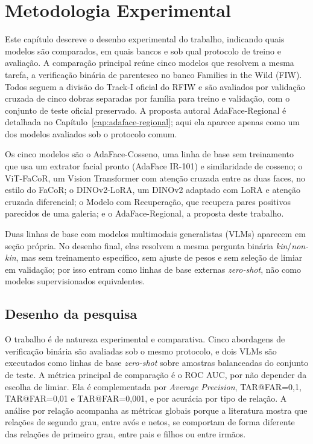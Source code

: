 \chapter[Metodologia Experimental]{Metodologia Experimental}
\label{cap:Metodologia}

Este capítulo descreve o desenho experimental do trabalho, indicando quais modelos são comparados, em quais bancos e sob qual protocolo de treino e avaliação. A comparação principal reúne cinco modelos que resolvem a mesma tarefa, a verificação binária de parentesco no banco Families in the Wild (FIW). Todos seguem a divisão do Track-I oficial do RFIW e são avaliados por validação cruzada de cinco dobras separadas por família para treino e validação, com o conjunto de teste oficial preservado. A proposta autoral AdaFace-Regional é detalhada no Capítulo~\ref{cap:adaface-regional}; aqui ela aparece apenas como um dos modelos avaliados sob o protocolo comum.

Os cinco modelos são o AdaFace-Cosseno, uma linha de base sem treinamento que usa um extrator facial pronto (AdaFace IR-101) e similaridade de cosseno; o ViT-FaCoR, um Vision Transformer com atenção cruzada entre as duas faces, no estilo do FaCoR; o DINOv2-LoRA, um DINOv2 adaptado com LoRA e atenção cruzada diferencial; o Modelo com Recuperação, que recupera pares positivos parecidos de uma galeria; e o AdaFace-Regional, a proposta deste trabalho.

Duas linhas de base com modelos multimodais generalistas (VLMs) aparecem em seção própria. No desenho final, elas resolvem a mesma pergunta binária \textit{kin}/\textit{non-kin}, mas sem treinamento específico, sem ajuste de pesos e sem seleção de limiar em validação; por isso entram como linhas de base externas \textit{zero-shot}, não como modelos supervisionados equivalentes.

\section{Desenho da pesquisa}

O trabalho é de natureza experimental e comparativa. Cinco abordagens de verificação binária são avaliadas sob o mesmo protocolo, e dois VLMs são executados como linhas de base \textit{zero-shot} sobre amostras balanceadas do conjunto de teste. A métrica principal de comparação é o ROC AUC, por não depender da escolha de limiar. Ela é complementada por \textit{Average Precision}, TAR@FAR=0,1, TAR@FAR=0,01 e TAR@FAR=0,001, e por acurácia por tipo de relação. A análise por relação acompanha as métricas globais porque a literatura mostra que relações de segundo grau, entre avós e netos, se comportam de forma diferente das relações de primeiro grau, entre pais e filhos ou entre irmãos.

